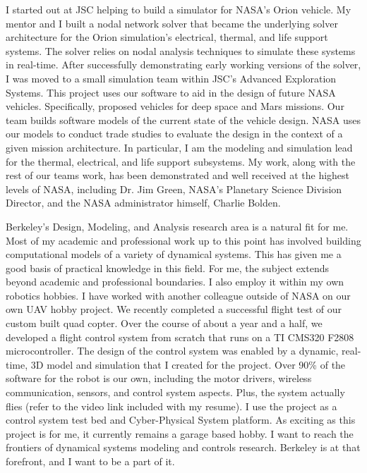 \documentclass{article}
\begin{document}
I started out at JSC helping to build a simulator for NASA's Orion vehicle. My mentor and I built a nodal network solver that became the underlying solver architecture for the Orion simulation's electrical, thermal, and life support systems.
The solver relies on nodal analysis techniques to simulate these systems in real-time.
After successfully demonstrating early working versions of the solver, I was moved
to a small simulation team within JSC's Advanced Exploration Systems.
This project uses our software to aid in the design of future
NASA vehicles. Specifically, proposed vehicles for deep space and Mars missions. 
Our team builds software models of the current state of the vehicle design. NASA uses our
models to conduct trade studies to evaluate the design in the context of a given mission architecture.
In particular, I am the modeling and simulation lead for the thermal, electrical, and life support
subsystems. My work, along with the rest of our teams work, has been demonstrated and well received 
at the highest levels of NASA, including Dr. Jim Green, NASA's Planetary Science Division Director, and 
the NASA administrator himself, Charlie Bolden.

Berkeley's Design, Modeling, and Analysis research area is a natural fit for me. Most of my academic and professional work up to this point has involved building computational models of a variety of dynamical systems. This has given me a good basis of practical knowledge in this field. For me, the subject extends beyond academic and professional boundaries. I also employ it within my own robotics hobbies. I have worked with another colleague outside of NASA on our own UAV hobby project. We recently completed a successful flight test of our custom built quad copter. Over the course of about a year and a half, we developed a flight control system from scratch that runs on a TI CMS320 F2808 microcontroller. The design of the control system was enabled by a dynamic, real-time, 3D model and simulation that I created for the project. Over 90\% of the software for the robot is our own, including the motor drivers, wireless communication, sensors, and control system aspects. Plus, the system actually flies (refer to the video link included with my resume). I use the project as a control system test bed and Cyber-Physical System platform. As exciting as this project is for me, it currently remains a garage based hobby. I want to reach the frontiers of dynamical systems modeling and controls research. Berkeley is at that forefront, and I want to be a part of it.
\end{document}
